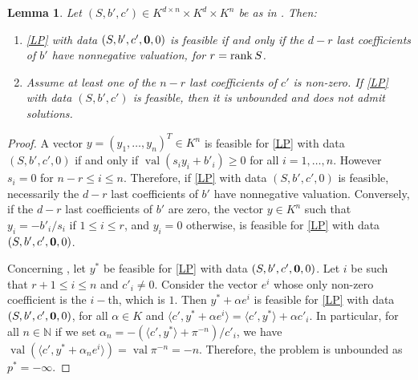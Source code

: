 \documentclass[a4paper,oneside,10pt]{article}
\newtheorem{lemma}[theorem]{Lemma}
\newcommand{\corentin}[1]{{\color{red} #1}} %
\DeclareMathOperator{\val}{val}
\begin{document}
\begin{lemma}\label{prop:reduc}
  Let $(S,b',c') \in K^{d\times n} \times K^d \times K^n$ be as in .
  Then:
  \begin{enumerate}
  \item \label{prop:reduc_it1}
    \eqref{LP} with data $(S,b',c',{\bf 0},0)$ is feasible if and only if the $d-r$ last coefficients
    of $b'$ have nonnegative valuation, for $r = {\rm rank}\,S$.
  \item \label{prop:reduc_it2}
    Assume at least one of the $n-r$ last coefficients of $c'$ is non-zero. If \eqref{LP} with
    data $(S,b',c')$ is feasible, then it is unbounded and does not admit solutions.
  \end{enumerate}
\end{lemma}
\begin{proof}
  A vector $y = (y_1, \ldots, y_n)^T \in K^n$ is feasible for \eqref{LP} with data
  $(S,b',c',0)$ if and only if $\val(s_i y_i + b'_i) \geq 0$ for all $i = 1,\ldots,n$.
  However $s_i = 0$ for $n-r \leq i\leq n$. Therefore, if \eqref{LP} with data $(S,b',c',0)$ is feasible,
  necessarily the $d-r$ last coefficients of $b'$ have nonnegative valuation.
  Conversely, if the $d-r$ last coefficients of $b'$ are zero, the vector $y \in K^n$ such that
  $y_i = {-b'_i}/{s_i}$ if $1 \leq i \leq r$, and $y_i =0$ otherwise, is feasible for \eqref{LP}
  with data $(S,b',c',{\bf 0},0)$.

  Concerning , let $y^*$ be feasible for \eqref{LP} with data $(S,b',c',{\bf 0},0)$.
  Let $i$ be such that $r+1 \leq i \leq n$ and $c'_i \neq 0$. Consider the vector $e^i$ whose only non-zero
  coefficient is the $i-$th, which is $1$. Then $y^* + \alpha e^i$ is feasible for \eqref{LP} with data $(S,b',c',{\bf 0},0)$,
  for all $\alpha \in K$ and $\langle c', y^* + \alpha e^i\rangle = \langle c' , y^* \rangle + \alpha c'_i$.
  In particular, for all $n \in \mathbb{N}$ if we set $\alpha_n = -({\langle c', y^* \rangle + \pi^{-n}})/{c'_i}$,
  we have $\val \left(\langle c', y^* + \alpha_n e ^i \rangle\right) = \val \pi^{-n} = -n$.
  Therefore, the problem is unbounded as $p^* = -\infty$.
\end{proof}

\end{document}
